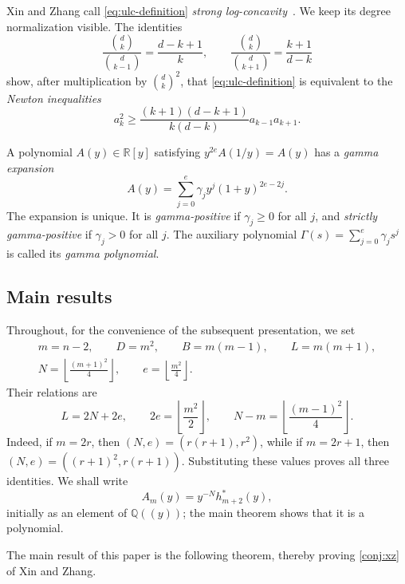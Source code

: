 \documentclass[reqno, 12pt]{article}
\numberwithin{equation}{section}
\theoremstyle{definition}
\newcommand{\RR}{\mathbb R}
\begin{document}
Xin and Zhang call \eqref{eq:ulc-definition} \emph{strong log-concavity}~\cite[Section~5]{XZ}.  We keep its degree
normalization visible.  The identities
\[
 \frac{\binom dk}{\binom d{k-1}}=\frac{d-k+1}{k},\qquad
 \frac{\binom dk}{\binom d{k+1}}=\frac{k+1}{d-k}
\]
show, after multiplication by $\binom dk^2$, that \eqref{eq:ulc-definition} is equivalent to the \emph{Newton inequalities}
\begin{equation}\label{eq:ulc-factor}
a_k^2\geq\frac{(k+1)(d-k+1)}{k(d-k)}a_{k-1}a_{k+1}.
\end{equation}


A polynomial $A(y)\in\RR[y]$ satisfying $y^{2e}A(1/y)=A(y)$ has a
\emph{gamma expansion}
\[A(y)=\sum_{j=0}^e\gamma_jy^j(1+y)^{2e-2j}.
\]
The expansion is unique.
It is \emph{gamma-positive} if $\gamma_j\geq0$ for all $j$, and
\emph{strictly gamma-positive} if $\gamma_j>0$ for all $j$.
The auxiliary polynomial $\Gamma(s)=\sum_{j=0}^e\gamma_js^j$ is
called its \emph{gamma polynomial}.



\subsection{Main results}


Throughout, for the convenience of the subsequent presentation, we set
\begin{equation}\label{eq:parameters}
\begin{gathered}
m=n-2,\qquad D=m^2,\qquad B=m(m-1),\qquad L=m(m+1),\\
N=\left\lfloor\frac{(m+1)^2}{4}\right\rfloor,
\qquad e=\left\lfloor\frac{m^2}{4}\right\rfloor.
\end{gathered}
\end{equation}
Their relations are
\begin{equation}\label{eq:parameter-relations}
L=2N+2e,\qquad
2e=\left\lfloor\frac{m^2}{2}\right\rfloor,\qquad
N-m=\left\lfloor\frac{(m-1)^2}{4}\right\rfloor.
\end{equation}
Indeed, if $m=2r$, then $(N,e)=(r(r+1),r^2)$, while if
$m=2r+1$, then $(N,e)=((r+1)^2,r(r+1))$.  Substituting these
values proves all three identities.  We shall write
$$A_m(y)=y^{-N}h_{m+2}^*(y),$$ initially as an element of
$\mathbb Q((y))$; the main theorem shows that it is a polynomial.


The main result of this paper is the following theorem, thereby proving \cref{conj:xz} of Xin and Zhang.
\end{document}
